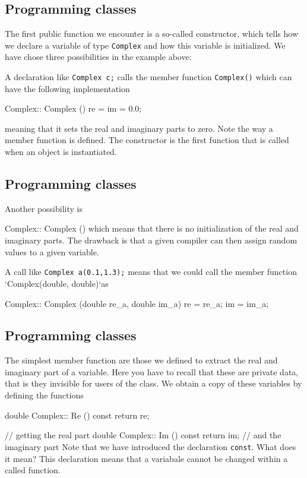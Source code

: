 \documentclass[%
oneside,                 %
final,                   %
10pt]{article}
\begin{document}
{{{{{{{{{{{{{{{%
\subsection{Programming classes}

The first public function we encounter is a so-called
constructor, which  tells how we declare a variable of type \Verb!Complex!
and how this variable is initialized. We have chose  three possibilities in the example above:

A declaration like \Verb!Complex c;! calls the member function \Verb!Complex()! which can have the following implementation

\bcppcod
Complex:: Complex () { re = im = 0.0; }
\ecppcod

meaning that it sets the real and imaginary parts to zero. Note the
way a member function is defined. The constructor is the first
function that is called when an object is instantiated.

\subsection{Programming classes}

Another possibility is

\bcppcod
Complex:: Complex () {}
\ecppcod
which means that there is no initialization of the real and imaginary parts. The drawback is that a given compiler can then assign random values to a given variable.

A call like \Verb!Complex a(0.1,1.3);! means that we could call the member function `Complex(double, double)`as

\bcppcod
Complex:: Complex (double re_a, double im_a) {
    re = re_a; im = im_a; }
\ecppcod

\subsection{Programming classes}

The simplest member function are those we defined to extract
the real and imaginary part of a variable. Here you have to recall that these are private data,
that is they invisible for users of the class.  We obtain a copy of these variables by defining the
functions

\bcppcod
double Complex:: Re () const { return re; }} //  getting the real part
double Complex:: Im () const { return im; }  //   and the imaginary part
\ecppcod
Note that we have introduced   the declaration  \Verb!const!.  What does it mean?
This declaration means that a variabale cannot be changed within  a called function.

}}}}}}}}}}}}}}
\end{document}
